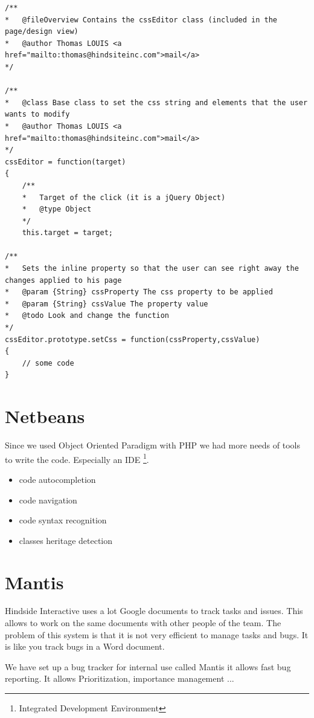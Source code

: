 \lstset{language=Javascript}
\begin{lstlisting}[label=jsdoc-code,caption=Javascript documentation in a Javascript class]
/**
*	@fileOverview Contains the cssEditor class (included in the page/design view)
*	@author Thomas LOUIS <a href="mailto:thomas@hindsiteinc.com">mail</a>
*/

/**
*	@class Base class to set the css string and elements that the user wants to modify
*	@author Thomas LOUIS <a href="mailto:thomas@hindsiteinc.com">mail</a>
*/
cssEditor = function(target)
{
	/**
	*	Target of the click (it is a jQuery Object)
	*	@type Object
	*/
	this.target = target;

/**
*	Sets the inline property so that the user can see right away the changes applied to his page
*	@param {String} cssProperty The css property to be applied
*	@param {String} cssValue The property value
*	@todo Look and change the function
*/
cssEditor.prototype.setCss = function(cssProperty,cssValue)
{
	// some code		
}

\end{lstlisting}

\section{Netbeans}

Since we used Object Oriented Paradigm with PHP we had more needs of tools 
to write the code. Especially an IDE \footnote{Integrated Development Environment}.

\begin{itemize}
\item code autocompletion
\item code navigation
\item code syntax recognition
\item classes heritage detection
\end{itemize}


\section{Mantis}
Hindside Interactive uses a lot Google documents to track tasks and issues. This allows to work on the same documents with other people of the team. The problem of this system is that it is not very efficient to manage tasks and bugs. It is like you track bugs in a Word document.

We have set up  a bug tracker for internal use called Mantis it allows fast bug reporting. It allows Prioritization, importance management ...

 

